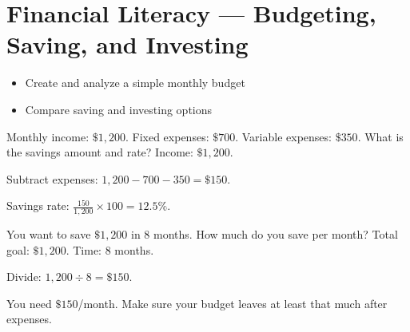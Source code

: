 \section{Financial Literacy --- Budgeting, Saving, and Investing}

\begin{stepGoal}
\begin{itemize}
    \item Create and analyze a simple monthly budget
    \item Compare saving and investing options
\end{itemize}
\end{stepGoal}

\begin{stepVocabBox}
\end{stepVocabBox}

\begin{stepsCard}
\end{stepsCard}

\begin{stepExample}{Monthly income: $\$1{,}200$. Fixed expenses: $\$700$. Variable expenses: $\$350$. What is the savings amount and rate?}
     Income: $\$1{,}200$.

     Subtract expenses: $1{,}200 - 700 - 350 = \$150$.

     Savings rate: $\frac{150}{1{,}200} \times 100 = 12.5\%$.
\end{stepExample}

\begin{stepExample}{You want to save $\$1{,}200$ in $8$ months. How much do you save per month?}
     Total goal: $\$1{,}200$. Time: $8$ months.

     Divide: $1{,}200 \div 8 = \$150$.

     You need $\$150$/month. Make sure your budget leaves at least that much after expenses.
\end{stepExample}

